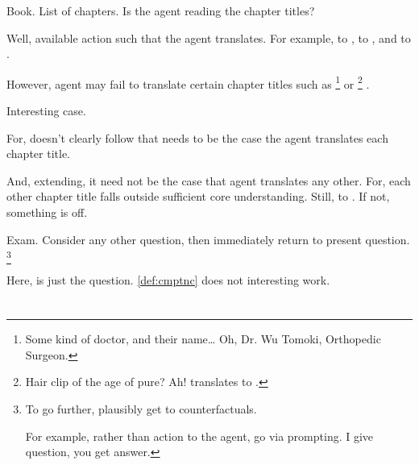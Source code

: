 \begin{note}
  \begin{illustration}[Translation]
    Book.
    List of chapters.
    Is the agent reading the chapter titles?
  \end{illustration}

  Well, available action such that the agent translates.
  For example,  to ,  to , and  to .

  However, agent may fail to translate certain chapter titles such as %
  \footnote{
    Some kind of doctor, and their name\dots
    Oh, Dr. Wu Tomoki, Orthopedic Surgeon.
  }
  or %
  \footnote{
    Hair clip of the age of pure?
    Ah!  translates to .
  }%
  .

  Interesting case.

  For, doesn't clearly follow that needs to be the case the agent translates each chapter title.

  And, extending, it need not be the case that agent translates any other.
  For, each other chapter title falls outside sufficient core understanding.
  Still,  to .
  If not, something is off.
\end{note}

\begin{note}
  \begin{illustration}[Focus]
    Exam.
    Consider any other question, then immediately return to present question.%
    \footnote{
      To go further, plausibly get to counterfactuals.

      For example, rather than action to the agent, go via prompting.
      I give question, you get answer.
    }
  \end{illustration}

  Here, \tRep{} is just the question.
  \autoref{def:cmptnc} does not interesting work.
\end{note}

\section{}
\label{cha:typical:sec:tC}

